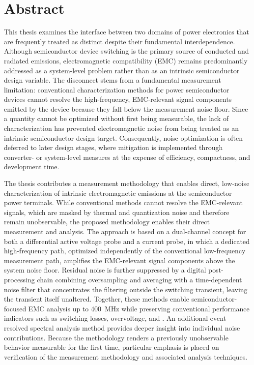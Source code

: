 

\chapter{Abstract}

This thesis examines the interface between two domains of power electronics that are frequently treated as distinct despite their fundamental interdependence.
Although semiconductor device switching is the primary source of conducted and radiated emissions, electromagnetic compatibility (EMC) remains predominantly addressed as a system-level problem rather than as an intrinsic semiconductor design variable.
The disconnect stems from a fundamental measurement limitation: conventional characterization methods for power semiconductor devices cannot resolve the high-frequency, EMC-relevant signal components emitted by the device because they fall below the measurement noise floor.
Since a quantity cannot be optimized without first being measurable, the lack of characterization has prevented electromagnetic noise from being treated as an intrinsic semiconductor design target.
Consequently, noise optimization is often deferred to later design stages, where mitigation is implemented through converter- or system-level measures at the expense of efficiency, compactness, and development time.

The thesis contributes a measurement methodology that enables direct, low-noise characterization of intrinsic electromagnetic emissions at the semiconductor power terminals.
While conventional methods cannot resolve the EMC-relevant signals, which are masked by thermal and quantization noise and therefore remain unobservable, the proposed methodology enables their direct measurement and analysis.
The approach is based on a dual-channel concept for both a differential active voltage probe and a current probe, in which a dedicated high-frequency path, optimized independently of the conventional low-frequency measurement path, amplifies the EMC-relevant signal components above the system noise floor.
Residual noise is further suppressed by a digital post-processing chain combining oversampling and averaging with a time-dependent noise filter that concentrates the filtering outside the switching transient, leaving the transient itself unaltered.
Together, these methods enable semiconductor-focused EMC analysis up to \SI{400}{MHz} while preserving conventional performance indicators such as switching losses, overvoltage, and .
An additional event-resolved spectral analysis method provides deeper insight into individual noise contributions.
Because the methodology renders a previously unobservable behavior measurable for the first time, particular emphasis is placed on verification of the measurement methodology and associated analysis techniques.

